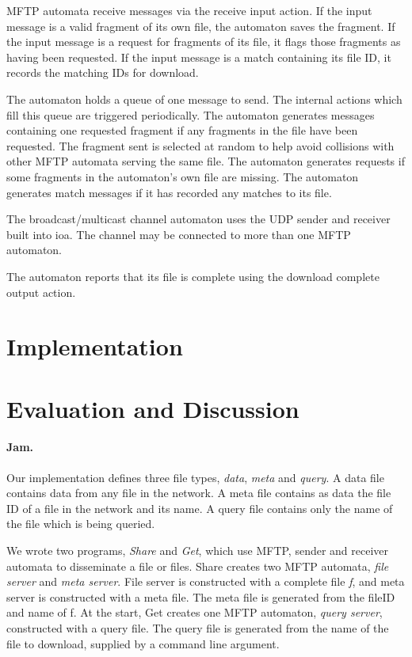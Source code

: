 \documentclass[letterpaper]{article}
\begin{document}
MFTP automata receive messages via the receive input action.
If the input message is a valid fragment of its own file, the automaton saves the fragment.
If the input message is a request for fragments of its file, it flags those fragments as having been requested.
If the input message is a match containing its file ID, it records the matching IDs for download.

The automaton holds a queue of one message to send. 
The internal actions which fill this queue are triggered periodically.
The automaton generates messages containing one requested fragment if any fragments in the file have been requested.
The fragment sent is selected at random to help avoid collisions with other MFTP automata serving the same file.
The automaton generates requests if some fragments in the automaton's own file are missing.
The automaton generates match messages if it has recorded any matches to its file.

The broadcast/multicast channel automaton uses the UDP sender and receiver built into ioa.
The channel may be connected to more than one MFTP automaton.

The automaton reports that its file is complete using the download complete output action.

\section{Implementation}

\section{Evaluation and Discussion\label{evaluation}}
\paragraph{Jam.} %
Our implementation defines three file types, \emph{data}, \emph{meta} and \emph{query}.  
A data file contains data from any file in the network.
A meta file contains as data the file ID of a file in the network and its name. 
A query file contains only the name of the file which is being queried.

We wrote two programs, \emph{Share} and \emph{Get}, which use MFTP, sender and receiver automata to disseminate a file or files. %
Share creates two MFTP automata, \emph{file server} and \emph{meta server}.
File server is constructed with a complete file \emph{f}, and meta server is constructed with a meta file.
The meta file is generated from the fileID and name of f.
At the start, Get creates one MFTP automaton, \emph{query server}, constructed with a query file.
The query file is generated from the name of the file to download, supplied by a command line argument.
\end{document}
